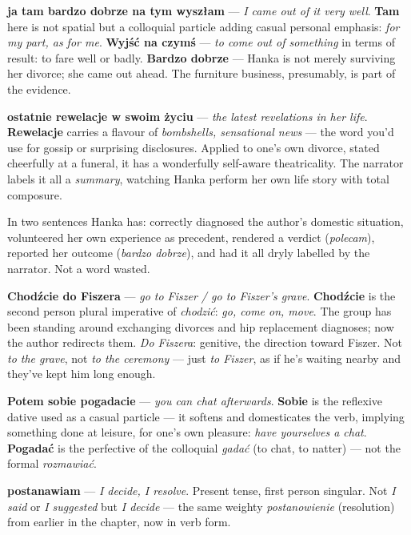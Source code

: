 \textbf{ja tam bardzo dobrze na tym wyszłam} --- \textit{I came out of
it very well}. \textbf{Tam} here is not spatial but a colloquial
particle adding casual personal emphasis: \textit{for my part, as for
me}. \textbf{Wyjść na czymś} --- \textit{to come out of something} in
terms of result: to fare well or badly. \textbf{Bardzo dobrze} ---
Hanka is not merely surviving her divorce; she came out ahead. The
furniture business, presumably, is part of the evidence.

\textbf{ostatnie rewelacje w swoim życiu} --- \textit{the latest
revelations in her life}. \textbf{Rewelacje} carries a flavour of
\textit{bombshells, sensational news} --- the word you'd use for gossip
or surprising disclosures. Applied to one's own divorce, stated
cheerfully at a funeral, it has a wonderfully self-aware theatricality.
The narrator labels it all a \textit{summary}, watching Hanka perform
her own life story with total composure.

In two sentences Hanka has: correctly diagnosed the author's domestic
situation, volunteered her own experience as precedent, rendered a
verdict (\textit{polecam}), reported her outcome (\textit{bardzo
dobrze}), and had it all dryly labelled by the narrator. Not a word
wasted.



\textbf{Chodźcie do Fiszera} --- \textit{go to Fiszer / go to Fiszer's
grave}. \textbf{Chodźcie} is the second person plural imperative of
\textit{chodzić}: \textit{go, come on, move}. The group has been
standing around exchanging divorces and hip replacement diagnoses; now
the author redirects them. \textit{Do Fiszera}: genitive, the direction
toward Fiszer. Not \textit{to the grave}, not \textit{to the ceremony}
--- just \textit{to Fiszer}, as if he's waiting nearby and they've kept
him long enough.

\textbf{Potem sobie pogadacie} --- \textit{you can chat afterwards}.
\textbf{Sobie} is the reflexive dative used as a casual particle ---
it softens and domesticates the verb, implying something done at
leisure, for one's own pleasure: \textit{have yourselves a chat}.
\textbf{Pogadać} is the perfective of the colloquial \textit{gadać}
(to chat, to natter) --- not the formal \textit{rozmawiać}.

\textbf{postanawiam} --- \textit{I decide, I resolve}. Present tense,
first person singular. Not \textit{I said} or \textit{I suggested} but
\textit{I decide} --- the same weighty \textit{postanowienie}
(resolution) from earlier in the chapter, now in verb form.

